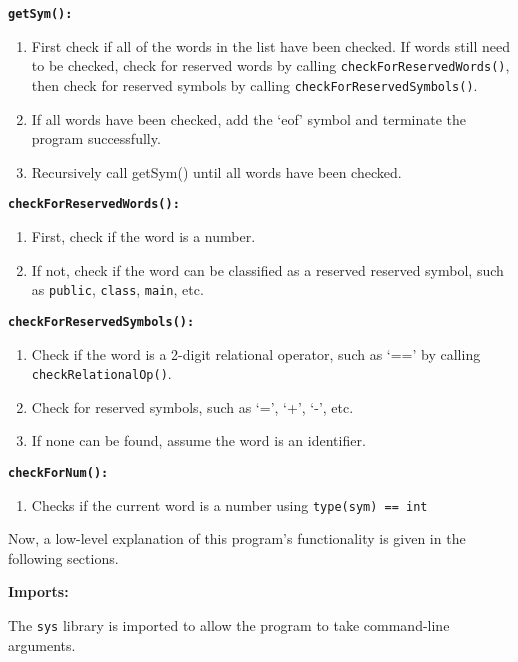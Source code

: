 \documentclass[11pt]{article}
\begin{document}
\textbf{\tt getSym():}

\begin{enumerate}[label=\alph*)]
	\item First check if all of the words in the list have been checked. If words still need to be checked, check for reserved words by calling {\tt checkForReservedWords()}, then check for reserved symbols by calling {\tt checkForReservedSymbols()}. 

	\item If all words have been checked, add the `eof' symbol and terminate the program successfully.
	\item Recursively call getSym() until all words have been checked.
\end{enumerate}

\textbf{\tt checkForReservedWords():}

\begin{enumerate}[label=\alph*)]
	\item First, check if the word is a number.
	\item If not, check if the word can be classified as a reserved reserved symbol, such as {\tt public}, {\tt class}, {\tt main}, etc.
\end{enumerate}

\textbf{\tt checkForReservedSymbols():}

\begin{enumerate}[label=\alph*)]
	\item Check if the word is a 2-digit relational operator, such as `==' by calling {\tt checkRelationalOp()}.
	\item Check for reserved symbols, such as `=', `+', `-', etc.
	\item If none can be found, assume the word is an identifier.
\end{enumerate}

\textbf{\tt checkForNum():}

\begin{enumerate}[label=\alph*)]
	\item Checks if the current word is a number using {\tt type(sym) == int}
\end{enumerate}

Now, a low-level explanation of this program’s functionality is given in the following sections.

\bigskip
\textbf{Imports:}

\bigskip
The {\tt sys} library is imported to allow the program to take command-line arguments.
\end{document}

